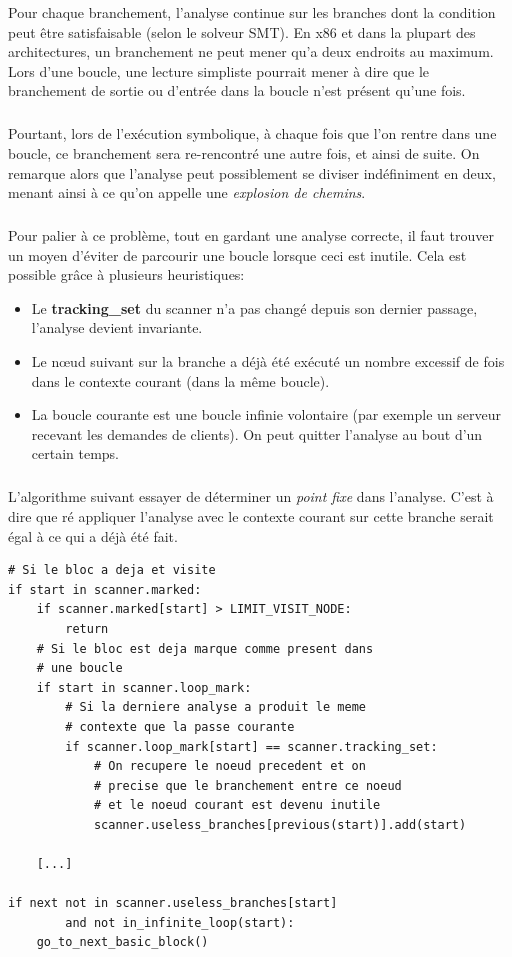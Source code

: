 Pour chaque branchement, l'analyse continue sur les branches dont la condition peut être satisfaisable (selon le solveur SMT). En x86 et dans la plupart des architectures,
un branchement ne peut mener qu'a deux endroits au maximum. Lors d'une boucle, une lecture simpliste pourrait mener à dire que le branchement de sortie ou d'entrée dans la boucle n'est présent qu'une fois.
\subparagraph{}
Pourtant, lors de l'exécution symbolique, à chaque fois que l'on rentre dans une boucle, ce branchement sera re-rencontré une autre fois, et ainsi de suite.
On remarque alors que l'analyse peut possiblement se diviser indéfiniment en deux, menant ainsi à ce qu'on appelle une \textit{explosion de chemins}.
\subparagraph{}
Pour palier à ce problème, tout en gardant une analyse correcte, il faut trouver un moyen d'éviter de parcourir une boucle lorsque ceci est inutile. Cela est possible grâce à plusieurs heuristiques:
\begin{itemize}
    \item Le \textbf{tracking\_set} du scanner n'a pas changé depuis son dernier passage, l'analyse devient invariante.
    \item Le nœud suivant sur la branche a déjà été exécuté un nombre excessif de fois dans le contexte courant (dans la même boucle).
    \item La boucle courante est une boucle infinie volontaire (par exemple un serveur recevant les demandes de clients). On peut quitter l'analyse au bout d'un certain temps.
\end{itemize}
\subparagraph{}
L'algorithme suivant essayer de déterminer un \textit{point fixe} dans l'analyse. C'est à dire que ré appliquer l'analyse avec le contexte courant sur cette branche serait
égal à ce qui a déjà été fait.
\begin {lstlisting}[frame=single]
# Si le bloc a deja et visite
if start in scanner.marked:
    if scanner.marked[start] > LIMIT_VISIT_NODE:
        return
    # Si le bloc est deja marque comme present dans
    # une boucle
    if start in scanner.loop_mark:
        # Si la derniere analyse a produit le meme
        # contexte que la passe courante
        if scanner.loop_mark[start] == scanner.tracking_set:
            # On recupere le noeud precedent et on
            # precise que le branchement entre ce noeud
            # et le noeud courant est devenu inutile
            scanner.useless_branches[previous(start)].add(start)

    [...]

if next not in scanner.useless_branches[start]
        and not in_infinite_loop(start):
    go_to_next_basic_block()
\end{lstlisting}
